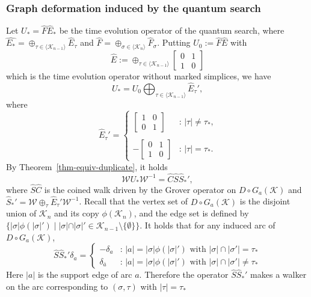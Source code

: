 \documentclass[a4paper,12pt]{article}
\newcommand{\bra}{\langle}
\newcommand{\ket}{\rangle}
\numberwithin{equation}{section}
\begin{document}
\subsubsection{Graph deformation induced by the quantum search}

Let $U_*=\hat{F}\hat{E}_*$ be the time evolution operator of the quantum search, 
where $\hat{E_*}=\oplus_{\tau\in\bra \mathcal{K}_{n-1} \ket}\hat{E}_\tau$ and $\hat{F}=\oplus_{\sigma\in\bra \mathcal{K}_{n} \ket}\hat{F}_\sigma$. 
Putting $U_0:=\hat{F}\hat{E}$ with 
	\[ \hat{E}:=\oplus_{\tau\in\bra \mathcal{K}_{n-1} \ket}\begin{bmatrix}0&1 \\ 1 &0\end{bmatrix}\] 
which is the time evolution operator without marked simplices, we have 
	\[ U_*=U_0 \bigoplus_{\tau \in \bra \mathcal{K}_{n-1} \ket} \hat{E}_\tau',   \]
where 
	\[\hat{E}_\tau'=\begin{cases} 
        \begin{bmatrix} 1 & 0 \\ 0 & 1 \end{bmatrix} & \text{: $|\tau|\neq \tau_*$,} \\ 
        \\
        -\begin{bmatrix} 0 & 1 \\ 1 & 0 \end{bmatrix} & \text{: $|\tau|= \tau_*$.}
        \end{cases}  \]
By Theorem~\ref{thm-equiv-duplicate}, it holds
	\[ \mathcal{W}U_*\mathcal{W}^{-1}=\hat{C}\hat{S}\hat{S}_*', \]
where $\hat{S}\hat{C}$ is the coined walk driven by the Grover operator on $D\circ G_a(\mathcal{K})$  
and $\hat{S}_*'=\mathcal{W}\oplus_{\tau}\hat{E}_\tau'\mathcal{W}^{-1}$. 
Recall that the vertex set of $D\circ G_a(\mathcal{K})$ is the disjoint union of $\mathcal{K}_n$ and its copy $\phi(\mathcal{K}_n)$, and 
the edge set is defined by $\{ |\sigma|\phi(|\sigma|') \;|\; |\sigma|\cap |\sigma|'\in \mathcal{K}_{n-1}\setminus\{\emptyset\}\}$. 
It holds that for any induced arc of $D\circ G_a(\mathcal{K})$,  
	\[ \hat{S}\hat{S}_*'\delta_a=\begin{cases}  -\delta_{a} & \text{: $|a|=|\sigma| \phi(|\sigma|')$ with $|\sigma|\cap|\sigma'|=\tau_*$} \\ 
        \delta_{\bar{a}} & \text{: $|a|=|\sigma| \phi(|\sigma|')$ with $|\sigma|\cap|\sigma'| \neq \tau_*$} \end{cases} \]
Here $|a|$ is the support edge of arc $a$. 
Therefore the operator $\hat{S}\hat{S}_*'$ makes a walker on the arc corresponding to $(\sigma,\tau)$ with $|\tau|=\tau_*$ 
\end{document}
